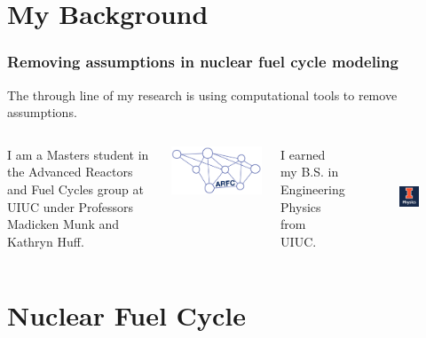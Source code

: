 \documentclass[9pt]{beamer}
\begin{document}
\section{My Background}
  \begin{frame}
    \frametitle{Removing assumptions in nuclear fuel cycle modeling}
    The through line of my research is using computational tools to remove
    assumptions.
    \vspace{0.6cm}
    \begin{columns}
      \column[t]{5cm}
      I am a Masters student in the Advanced Reactors and Fuel Cycles group at
      UIUC under Professors Madicken Munk and Kathryn Huff.
      \begin{center}
              \includegraphics[height=0.2\textheight]{./images/arfc-logo}
      \end{center}

      \column[t]{5cm}
      I earned my B.S. in Engineering Physics from UIUC.
      \begin{figure}[htbp!]
        \begin{center}
          \includegraphics[height=3cm]{./images/ill_phys.png}
        \end{center}
        \label{fig:uiuc_phys}
      \end{figure}
    \end{columns}
  \end{frame}


\section{Nuclear Fuel Cycle}
\end{document}
